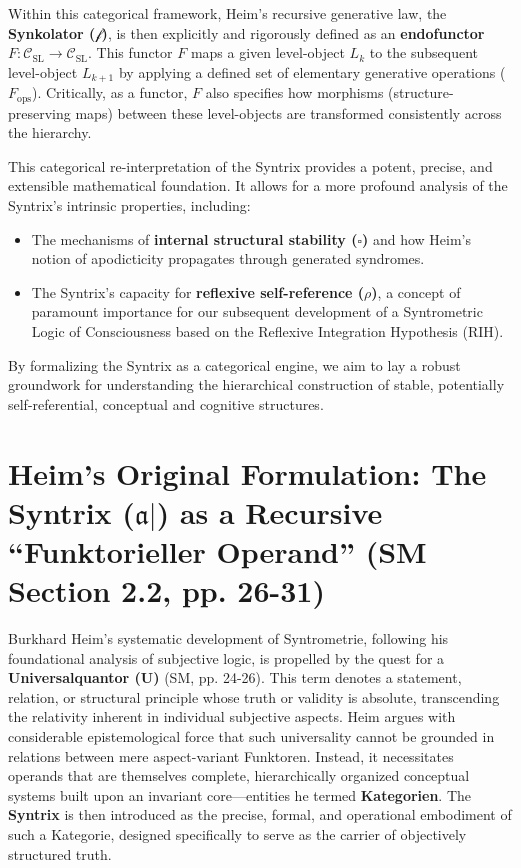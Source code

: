 \documentclass[
    12pt,              %
    a4paper,           %
    headings=normal,   %
    twoside=true,      %
    BCOR=8mm,          %
]{scrbook}
\newcommand{\q}[1]{\enquote{#1}}
\newcommand{\synkolator}{\mathcal{f}}
\newcommand{\universalquantor}{\bm{U}}
\newcommand{\BoxSyn}{\square}
\newcommand{\fops}{F_{\text{ops}}}
\begin{document}
Within this categorical framework, Heim's recursive generative law, the \textbf{Synkolator (\(\synkolator\))}, is then explicitly and rigorously defined as an \textbf{endofunctor \(F: \mathcal{C}_{\text{SL}} \to \mathcal{C}_{\text{SL}}\)}. This functor \(F\) maps a given level-object \(L_k\) to the subsequent level-object \(L_{k+1}\) by applying a defined set of elementary generative operations (\(\fops\)). Critically, as a functor, \(F\) also specifies how morphisms (structure-preserving maps) between these level-objects are transformed consistently across the hierarchy.

This categorical re-interpretation of the Syntrix provides a potent, precise, and extensible mathematical foundation. It allows for a more profound analysis of the Syntrix's intrinsic properties, including:
\begin{itemize}
    \item   The mechanisms of \textbf{internal structural stability (\(\BoxSyn\))} and how Heim's notion of apodicticity propagates through generated syndromes.
    \item   The Syntrix's capacity for \textbf{reflexive self-reference (\(\rho\))}, a concept of paramount importance for our subsequent development of a Syntrometric Logic of Consciousness based on the Reflexive Integration Hypothesis (RIH).
\end{itemize}
By formalizing the Syntrix as a categorical engine, we aim to lay a robust groundwork for understanding the hierarchical construction of stable, potentially self-referential, conceptual and cognitive structures.

\section{Heim’s Original Formulation: The Syntrix (\(\mathfrak{a}|\)) as a Recursive \q{Funktorieller Operand} (SM Section 2.2, pp. 26-31)}
\label{sec:ch2_heim_original_syntrix} 

Burkhard Heim's systematic development of Syntrometrie, following his foundational analysis of subjective logic, is propelled by the quest for a \textbf{Universalquantor (\(\universalquantor\))} (SM, pp. 24-26). This term denotes a statement, relation, or structural principle whose truth or validity is absolute, transcending the relativity inherent in individual subjective aspects. Heim argues with considerable epistemological force that such universality cannot be grounded in relations between mere aspect-variant Funktoren. Instead, it necessitates operands that are themselves complete, hierarchically organized conceptual systems built upon an invariant core—entities he termed \textbf{Kategorien}. The \textbf{Syntrix} is then introduced as the precise, formal, and operational embodiment of such a Kategorie, designed specifically to serve as the carrier of objectively structured truth.
\end{document}

